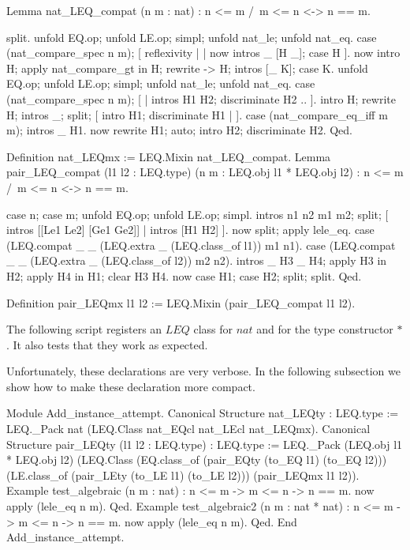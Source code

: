 \begin{coq_example}
Lemma nat_LEQ_compat (n m : nat) : n <= m /\ m <= n <-> n == m.
\end{coq_example}
\begin{coq_eval}

split.
  unfold EQ.op; unfold LE.op; simpl; unfold nat_le; unfold nat_eq.
  case (nat_compare_spec n m); [ reflexivity | | now intros _ [H _]; case H ].
  now intro H; apply nat_compare_gt in H; rewrite -> H; intros [_ K]; case K.
unfold EQ.op; unfold LE.op; simpl; unfold nat_le; unfold nat_eq.
case (nat_compare_spec n m); [ | intros H1 H2; discriminate H2 .. ].
intro H; rewrite H; intros _; split; [ intro H1; discriminate H1 | ].
case (nat_compare_eq_iff m m); intros _ H1.
now rewrite H1; auto; intro H2; discriminate H2.
Qed.
\end{coq_eval}
\begin{coq_example}
Definition nat_LEQmx := LEQ.Mixin nat_LEQ_compat.
Lemma pair_LEQ_compat (l1 l2 : LEQ.type) (n m : LEQ.obj l1 * LEQ.obj l2) :
n <= m /\ m <= n <-> n == m.
\end{coq_example}
\begin{coq_eval}

case n; case m; unfold EQ.op; unfold LE.op; simpl.
intros n1 n2 m1 m2; split; [ intros [[Le1 Le2] [Ge1 Ge2]] | intros [H1 H2] ].
  now split; apply lele_eq.
case (LEQ.compat _ _ (LEQ.extra _ (LEQ.class_of l1)) m1 n1).
case (LEQ.compat _ _ (LEQ.extra _ (LEQ.class_of l2)) m2 n2).
intros _ H3 _ H4; apply H3 in H2; apply H4 in H1; clear H3 H4.
now case H1; case H2; split; split.
Qed.
\end{coq_eval}
\begin{coq_example}
Definition pair_LEQmx l1 l2 := LEQ.Mixin (pair_LEQ_compat l1 l2).
\end{coq_example}

The following script registers an $LEQ$ class for $nat$ and for the
type constructor $*$.  It also tests that they work as expected.

Unfortunately, these declarations are very verbose.  In the following
subsection we show how to make these declaration more compact.

\begin{coq_example}
Module Add_instance_attempt.
  Canonical Structure nat_LEQty : LEQ.type :=
    LEQ._Pack nat (LEQ.Class nat_EQcl nat_LEcl nat_LEQmx).
  Canonical Structure pair_LEQty (l1 l2 : LEQ.type) : LEQ.type :=
    LEQ._Pack (LEQ.obj l1 * LEQ.obj l2)
      (LEQ.Class
        (EQ.class_of (pair_EQty (to_EQ l1) (to_EQ l2)))
        (LE.class_of (pair_LEty (to_LE l1) (to_LE l2)))
        (pair_LEQmx l1 l2)).
  Example test_algebraic (n m : nat) : n <= m -> m <= n -> n == m.
   now apply (lele_eq n m). Qed.
  Example test_algebraic2 (n m : nat * nat) : n <= m -> m <= n -> n == m.
   now apply (lele_eq n m). Qed.
End Add_instance_attempt.
\end{coq_example}

